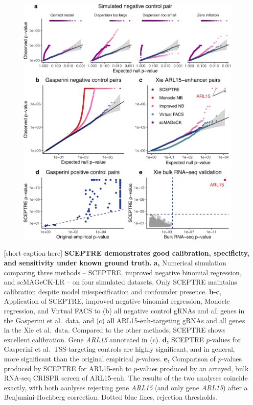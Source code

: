 \documentclass{nature}
\begin{document}
\clearpage
\begin{figure}[h!]
	\includegraphics[width = \textwidth]{figures/Figure3/Figure3_cropped.pdf}
 \end{figure}
[short caption here]{
	\label{fig:ground_truth}
	\textbf{SCEPTRE demonstrates good calibration, specificity, and sensitivity under known ground truth.} \textbf{a,} Numerical simulation comparing three methods -- SCEPTRE, improved negative binomial regression, and scMAGeCK-LR -- on four simulated datasets. Only SCEPTRE maintains calibration despite model misspecification and confounder presence. \textbf{b-c},  	Application of SCEPTRE, improved negative binomial regression, Monocle regression, and Virtual FACS to (b) all negative control gRNAs and all genes in the Gasperini et al.\ data, and (c) all ARL15-enh-targeting gRNAs and all genes in the Xie et al.\ data. Compared to the other methods, SCEPTRE shows excellent calibration. Gene \textit{ARL15} annotated in (c). \textbf{d,} SCEPTRE $p$-values for Gasperini et al.\ TSS-targeting controls are highly significant, and in general, more significant than the original empirical $p$-values. \textbf{e,} Comparison of $p$-values produced by SCEPTRE for ARL15-enh to $p$-values produced by an arrayed, bulk RNA-seq CRISPR screen of ARL15-enh. The results of the two analyses coincide exactly, with both aanlyses rejecting gene \textit{ARL15} (and only gene \textit{ARL15}) after a Benjamini-Hochberg correction. Dotted blue lines, rejection thresholds.}
\noindent\hrulefill
\end{document}
